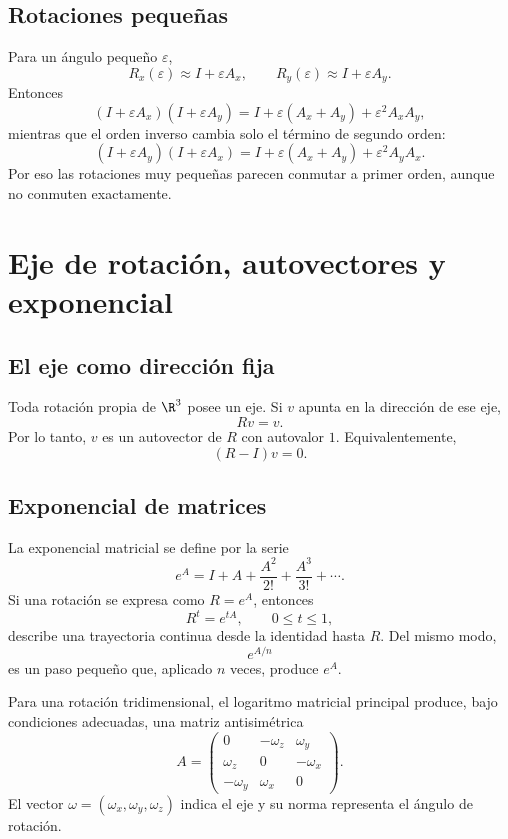 \subsection{Rotaciones pequeñas}

Para un ángulo pequeño \(\varepsilon\),
\[
  R_x(\varepsilon)\approx I+\varepsilon A_x,
  \qquad
  R_y(\varepsilon)\approx I+\varepsilon A_y.
\]
Entonces
\[
(I+\varepsilon A_x)(I+\varepsilon A_y)
=I+\varepsilon(A_x+A_y)+\varepsilon^2A_xA_y,
\]
mientras que el orden inverso cambia solo el término de segundo orden:
\[
(I+\varepsilon A_y)(I+\varepsilon A_x)
=I+\varepsilon(A_x+A_y)+\varepsilon^2A_yA_x.
\]
Por eso las rotaciones muy pequeñas parecen conmutar a primer orden, aunque no conmuten
exactamente.

\section{Eje de rotación, autovectores y exponencial}\label{sec:eje-exp}

\subsection{El eje como dirección fija}

Toda rotación propia de \(\R^3\) posee un eje. Si \(v\) apunta en la dirección de ese eje,
\[
  Rv=v.
\]
Por lo tanto, \(v\) es un autovector de \(R\) con autovalor \(1\). Equivalentemente,
\[
  (R-I)v=0.
\]

\subsection{Exponencial de matrices}

La exponencial matricial se define por la serie
\[
  e^A=I+A+\frac{A^2}{2!}+\frac{A^3}{3!}+\cdots.
\]
Si una rotación se expresa como \(R=e^A\), entonces
\[
  R^t=e^{tA},\qquad 0\le t\le1,
\]
describe una trayectoria continua desde la identidad hasta \(R\). Del mismo modo,
\[
  e^{A/n}
\]
es un paso pequeño que, aplicado \(n\) veces, produce \(e^A\).

\begin{resultado}
Para una rotación tridimensional, el logaritmo matricial principal produce, bajo condiciones
adecuadas, una matriz antisimétrica
\[
A=
\begin{pmatrix}
0&-\omega_z&\omega_y\\
\omega_z&0&-\omega_x\\
-\omega_y&\omega_x&0
\end{pmatrix}.
\]
El vector \(\omega=(\omega_x,\omega_y,\omega_z)\) indica el eje y su norma representa el
ángulo de rotación.
\end{resultado}

